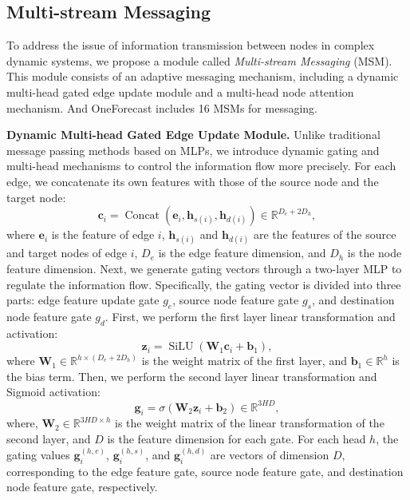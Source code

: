 \subsection{Multi-stream Messaging}
To address the issue of information transmission between nodes in complex dynamic systems, we propose a module called \textit{Multi-stream Messaging} (MSM). This module consists of an adaptive messaging mechanism, including a dynamic multi-head gated edge update module and a multi-head node attention mechanism. And OneForecast includes 16 MSMs for messaging.

\textbf{Dynamic Multi-head Gated Edge Update Module.} Unlike traditional message passing methods based on MLPs, we introduce dynamic gating and multi-head mechanisms to control the information flow more precisely. For each edge, we concatenate its own features with those of the source node and the target node:
\begin{equation}
\mathbf{c}_i = \operatorname{Concat}\left( \mathbf{e}_i, \mathbf{h}_{s(i)}, \mathbf{h}_{d(i)} \right) \in \mathbb{R}^{D_e + 2 D_h},
\end{equation}
where $\mathbf{e}_i$ is the feature of edge $i$, $\mathbf{h}_{s(i)}$ and $\mathbf{h}_{d(i)}$ are the features of the source and target nodes of edge $i$, $D_e$ is the edge feature dimension, and $D_h$ is the node feature dimension. Next, we generate gating vectors through a two-layer MLP to regulate the information flow. Specifically, the gating vector is divided into three parts: edge feature update gate $g_e$, source node feature gate $g_s$, and destination node feature gate $g_d$. First, we perform the first layer linear transformation and activation:
\begin{equation}
\mathbf{z}_i = \operatorname{SiLU}\left( \mathbf{W}_1 \mathbf{c}_i + \mathbf{b}_1 \right),
\end{equation}
where $\mathbf{W}_1 \in \mathbb{R}^{h \times (D_e + 2 D_h)}$ is the weight matrix of the first layer, and $\mathbf{b}_1 \in \mathbb{R}^h$ is the bias term. Then, we perform the second layer linear transformation and Sigmoid activation:
\begin{equation}
\mathbf{g}_i = \sigma\left( \mathbf{W}_2 \mathbf{z}_i + \mathbf{b}_2 \right) \in \mathbb{R}^{3 H D},
\end{equation}
where, $\mathbf{W}_2 \in \mathbb{R}^{3 H D\times h}$ is the weight matrix of the linear transformation of the second layer, and $D$ is the feature dimension for each gate. For each head $h$, the gating values $\mathbf{g}_i^{(h,e)}$, $\mathbf{g}_i^{(h,s)}$, and $\mathbf{g}_i^{(h,d)}$ are vectors of dimension $D$, corresponding to the edge feature gate, source node feature gate, and destination node feature gate, respectively.


